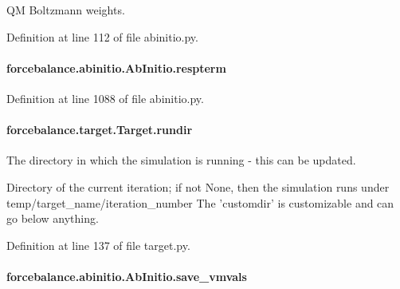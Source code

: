 Q\-M Boltzmann weights. 



Definition at line 112 of file abinitio.\-py.

\hypertarget{classforcebalance_1_1abinitio_1_1AbInitio_a689e3849518b33539442a473a41ed32d}{
\paragraph[{respterm}]{\setlength{\rightskip}{0pt plus 5cm}forcebalance.\-abinitio.\-Ab\-Initio.\-respterm\hspace{0.3cm}{\ttfamily [inherited]}}}\label{classforcebalance_1_1abinitio_1_1AbInitio_a689e3849518b33539442a473a41ed32d}


Definition at line 1088 of file abinitio.\-py.

\hypertarget{classforcebalance_1_1target_1_1Target_a6872de5b2d4273b82336ea5b0da29c9e}{
\paragraph[{rundir}]{\setlength{\rightskip}{0pt plus 5cm}forcebalance.\-target.\-Target.\-rundir\hspace{0.3cm}{\ttfamily [inherited]}}}\label{classforcebalance_1_1target_1_1Target_a6872de5b2d4273b82336ea5b0da29c9e}


The directory in which the simulation is running -\/ this can be updated. 

Directory of the current iteration; if not None, then the simulation runs under temp/target\-\_\-name/iteration\-\_\-number The 'customdir' is customizable and can go below anything.

Definition at line 137 of file target.\-py.

\hypertarget{classforcebalance_1_1abinitio_1_1AbInitio_a22037bf43728fa45f387390005e0b131}{
\paragraph[{save\-\_\-vmvals}]{\setlength{\rightskip}{0pt plus 5cm}forcebalance.\-abinitio.\-Ab\-Initio.\-save\-\_\-vmvals\hspace{0.3cm}{\ttfamily [inherited]}}}\label{classforcebalance_1_1abinitio_1_1AbInitio_a22037bf43728fa45f387390005e0b131}


